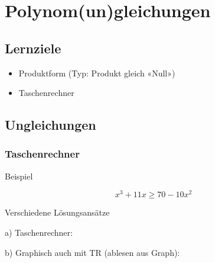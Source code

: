 
\section{Polynom(un)gleichungen}


\subsection*{Lernziele}

\begin{itemize}
\item Produktform (Typ: Produkt gleich «Null»)
\item Taschenrechner
\end{itemize}

\newpage


\newpage

\newpage


\subsection{Ungleichungen}
\subsubsection{Taschenrechner}

Beispiel

$$x^3 + 11x  \ge{} 70 - 10x^2$$

Verschiedene Lösungsansätze


a) Taschenrechner:




b) Graphisch auch mit TR (ablesen aus Graph):

